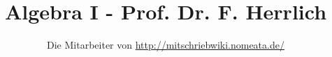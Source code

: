 \documentclass[a4paper,10pt,german]{scrbook}
\title{Algebra I - Prof. Dr. F. Herrlich}
\author{Die Mitarbeiter von \url{http://mitschriebwiki.nomeata.de/}}
\theoremstyle{saetze}
\theoremstyle{definitionen}
\begin{document}



\newcommand{\emp}[1]{\textbf{\emph{#1\index{#1}}}}
\newcommand{\empind}[2]{\textbf{\emph{#1\index{#2}}}}

\newenvironment{define}
    { \begin{flushleft} \begin{description} }
    { \end{description} \end{flushleft} }

\newenvironment{enum} {
      \begin{enumerate}
      \renewcommand{\labelenumi}{(\alph{enumi})}

      }
      { \end{enumerate} }

\newcommand{\bla}[0]
{\begin{tiny} $\left\{
\begin{array}{l}
             . \\
             . \\
             . \end{array}
        \right\}$
\end{tiny}}

\newcommand{\blab}[0]
{\begin{tiny} $\left\{
\begin{array}{l}
             Halbgruppen \\
             Monoiden \\
             Gruppen \end{array}
        \right\}$
\end{tiny}}


\newenvironment{ourshaded}{%
  \def\FrameCommand{\colorbox{shadecolor}}%
  \edef\frmlw{\linewidth}%
  \MakeFramed{\setlength\hsize{\linewidth}\FrameRestore}%
  \noindent}{\endMakeFramed}

\newcommand{\bew}[2]
{\definecolor{shadecolor}{rgb}{0.85,0.85,1}
 \begin{shaded}
 \textit{\textbf{Beweis: }}
 #1
 \begin{enum} #2
 \hfill \rule{2,1mm}{2,1mm} \end{enum}
 \end{shaded}
}
\end{document}
